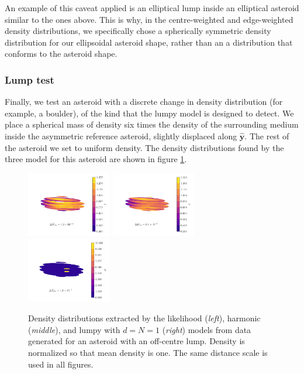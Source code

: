 \documentclass[fleqn,usenatbib]{mnras}
\newcommand{\unit}[1]{\bm{\hat{#1}}}
\begin{document}
An example of this caveat applied is an elliptical lump inside an elliptical asteroid similar to the ones above. This is why, in the centre-weighted and edge-weighted density distributions, we specifically chose a spherically symmetric density distribution for our ellipsoidal asteroid shape, rather than an a distribution that conforms to the asteroid shape.



\subsubsection{Lump test}

Finally, we test an asteroid with a discrete change in density distribution (for example, a boulder), of the kind that the lumpy model is designed to detect. We place a spherical mass of density six times the density of the surrounding medium inside the asymmetric reference asteroid, slightly displaced along $\unit y$. The rest of the asteroid we set to uniform density. The density distributions found by the three model for this asteroid are shown in figure \ref{fig:blob-density}.

\begin{figure}
  \centering
  \includegraphics[width=0.33\textwidth]{figs/blob-likelihood.pdf}\hfill
  \includegraphics[width=0.33\textwidth]{figs/blob-harmonic.pdf}\hfill
  \includegraphics[width=0.33\textwidth]{figs/blob-lumpy.pdf}

  \caption{Density distributions extracted by the likelihood (\textit{left}), harmonic (\textit{middle}), and lumpy with $d=N=1$ (\textit{right}) models from data generated for an asteroid with an off-centre lump. Density is normalized so that mean density is one. The same distance scale is used in all figures.}
  \label{fig:blob-density}
\end{figure}
\end{document}
